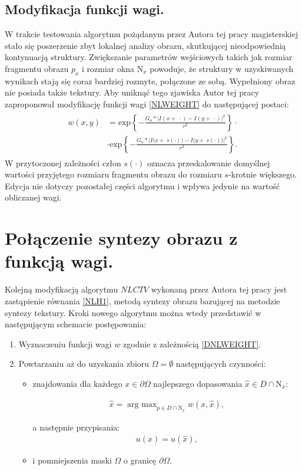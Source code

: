 \documentclass[a4paper,12pt,twoside,openany]{report}
\begin{document}
\subsection{Modyfikacja funkcji wagi.}
W trakcie testowania algorytmu pożądanym przez Autora tej pracy magisterskiej stało się poszerzenie zbyt lokalnej analizy obrazu, skutkującej nieodpowiednią kontynuacją struktury. Zwiększanie parametrów wejściowych takich jak rozmiar fragmentu obrazu $p_x$ i rozmiar okna $\text{N}_x$ powoduje, że struktury w uzyskiwanych wynikach stają się coraz bardziej rozmyte, połączone ze sobą. Wypełniony obraz nie posiada także tekstury. Aby uniknąć tego zjawiska Autor tej pracy zaproponował modyfikację funkcji wagi \eqref{NLWEIGHT} do następującej postaci:
\begin{align}
\begin{aligned}
w\left(x,y\right) &= {\mathrm{exp} \left\{-\frac{G_{\sigma }*{\big|I\left(x+\ \cdot \right)-I\left(y+\ \cdot \right)\big|}^2}{r^2}\right\} \cdot}\\
&\cdot {\mathrm{exp} \left\{-\frac{G_{\sigma }*{\Big|I\big(x+\ s(\cdot) \big)-I\big(y+\ s(\cdot) \big)\Big|}^2}{r^2}\right\} }.
\label{NLWEIGHTMODIFIED}
\end{aligned}
\end{align}
W przytoczonej zależności człon $s(\cdot)$ oznacza przeskalowanie  domyślnej wartości przyjętego rozmiaru fragmentu obrazu do rozmiaru $s$-krotnie większego. Edycja nie dotyczy pozostałej części  algorytmu i wpływa jedynie na wartość obliczanej wagi.
\section{Połączenie syntezy obrazu z funkcją wagi.}
Kolejną modyfikacją algorytmu $NLCTV$ wykonaną przez Autora tej pracy jest zastąpienie równania \eqref{NLH1}, metodą syntezy obrazu bazującej na metodzie syntezy tekstury. Kroki nowego algorytmu można wtedy przedstawić w następującym schemacie postępowania:
\begin{enumerate}
\item
Wyznaczeniu funkcji wagi $w$ zgodnie z zależnością \eqref{DNLWEIGHT}.
\item
Powtarzaniu aż do uzyskania zbioru $\Omega = \emptyset$ następujących czynności:
\begin{itemize}
\item
znajdowania dla każdego $x \in \partial\Omega$ najlepszego dopasowania $\hat{x} \in D \cap \mathrm{N}_x$:
\begin{large}
\begin{align}
\hat{x} = \mathop{\mathrm{arg \ max}}_{p \in D \cap \mathrm{N}_x} w(x,\hat{x}),
\end{align}
\end{large}
a następnie przypisania:
\begin{align}
u(x) = \hat{u}(\hat{x}),
\end{align}
\item
i pomniejszenia maski $\Omega$ o granicę $\partial\Omega$.
\end{itemize}
\end{enumerate}
\end{document}
